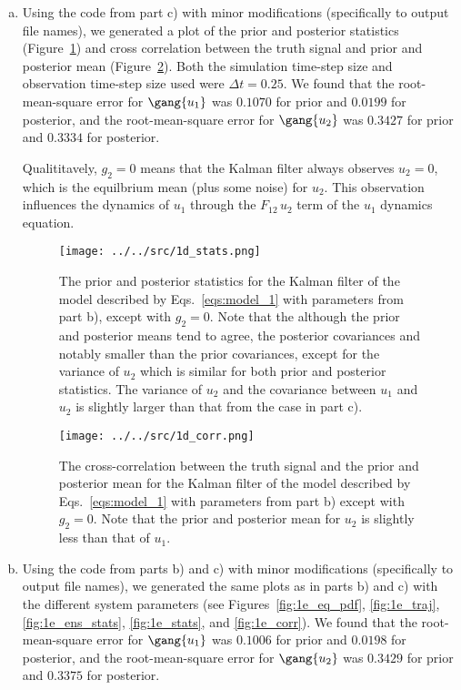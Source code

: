 \begin{enumerate}[a)]
	\item Using the code from part c) with minor modifications (specifically to output file names), we generated a plot of the prior and posterior statistics (Figure~\ref{fig:1d_stats}) and cross correlation between the truth signal and prior and posterior mean (Figure~\ref{fig:1d_corr}). Both the simulation time-step size and observation time-step size used were $\Delta t = 0.25$. We found that the root-mean-square error for $\gang{u_1}$ was $0.1070$ for prior and $0.0199$ for posterior, and the root-mean-square error for $\gang{u_2}$ was $0.3427$ for prior and $0.3334$ for posterior.
	
	Qualititavely, $g_2 = 0$ means that the Kalman filter always observes $u_2 = 0$, which is the equilbrium mean (plus some noise) for $u_2$. This observation influences the dynamics of $u_1$ through the $F_{12}\,u_2$ term of the $u_1$ dynamics equation. 
	
	\begin{figure}[H]
		\centering
		\texttt{[image: ../../src/1d\_stats.png]}
		\caption{The prior and posterior statistics for the Kalman filter of the model described by Eqs.~\ref{eqs:model_1} with parameters from part b), except with $g_2 = 0$. Note that the although the prior and posterior means tend to agree, the posterior covariances and notably smaller than the prior covariances, except for the variance of $u_2$ which is similar for both prior and posterior statistics. The variance of $u_2$ and the covariance between $u_1$ and $u_2$ is slightly larger than that from the case in part c).}
		\label{fig:1d_stats}
	\end{figure}
	
	\begin{figure}[H]
		\centering
		\texttt{[image: ../../src/1d\_corr.png]}
		\caption{The cross-correlation between the truth signal and the prior and posterior mean for the Kalman filter of the model described by Eqs.~\ref{eqs:model_1} with parameters from part b) except with $g_2 = 0$. Note that the prior and posterior mean for $u_2$ is slightly less than that of $u_1$.}
		\label{fig:1d_corr}
	\end{figure}
	
	\item Using the code from parts b) and c) with minor modifications (specifically to output file names), we generated the same plots as in parts b) and c) with the different system parameters (see Figures~\ref{fig:1e_eq_pdf}, \ref{fig:1e_traj}, \ref{fig:1e_ens_stats}, \ref{fig:1e_stats}, and \ref{fig:1e_corr}). We found that the root-mean-square error for $\gang{u_1}$ was $0.1006$ for prior and $0.0198$ for posterior, and the root-mean-square error for $\gang{u_2}$ was $0.3429$ for prior and $0.3375$ for posterior.
	

\end{enumerate}
